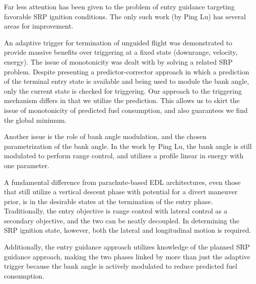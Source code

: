 \documentclass[]{article}
\begin{document}
Far less attention has been given to the problem of entry guidance targeting favorable SRP ignition conditions. The only such work (by Ping Lu) has several areas for improvement. 

An adaptive trigger for termination of unguided flight was demonstrated to provide massive benefits over triggering at a fixed state (downrange, velocity, energy). The issue of monotonicity was dealt with by solving a related SRP problem. Despite presenting a predictor-corrector approach in which a prediction of the terminal entry state is available and being used to module the bank angle, only the current state is checked for triggering. Our approach to the triggering mechanism differs in that we utilize the prediction. This allows us to skirt the issue of monotonicity of predicted fuel consumption, and also guarantees we find the global minimum. 

Another issue is the role of bank angle modulation, and the chosen parametrization of the bank angle. In the work by Ping Lu, the bank angle is still modulated to perform range control, and utilizes a profile linear in energy with one parameter. 

A fundamental difference from parachute-based EDL architectures, even those that still utilize a vertical descent phase with potential for a divert maneuver prior, is in the desirable states at the termination of the entry phase. Traditionally, the entry objective is range control with lateral control as a secondary objective, and the two can be neatly decoupled. In determining the SRP ignition state, however, both the lateral and longitudinal motion is required. 

Additionally, the entry guidance approach utilizes knowledge of the planned SRP guidance approach, making the two phases linked by more than just the adaptive trigger because the bank angle is actively modulated to reduce predicted fuel consumption. 
\end{document}
